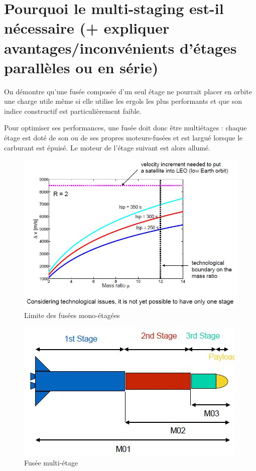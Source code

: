 \documentclass{report}
\begin{document}
\section{Pourquoi le multi-staging est-il nécessaire (+ expliquer avantages/inconvénients d'étages parallèles ou en série)}

On démontre qu'une fusée composée d'un seul étage ne pourrait placer en orbite une charge utile même si elle utilise les ergols les plus performants et que son indice constructif est particulièrement faible.

Pour optimiser ses performances, une fusée doit donc être multiétages : chaque étage est doté de son ou de ses propres moteurs-fusées et est largué lorsque le carburant est épuisé. Le moteur de l'étage suivant est alors allumé.

\begin{figure}[h!]
    \centering
    \includegraphics[scale=0.6]{52.JPG}
    \caption{Limite des fusées mono-étagées}
    \label{52}
\end{figure}

\begin{figure}[h!]
    \centering
    \includegraphics[scale=0.6]{53}
    \caption{Fusée multi-étage}
    \label{53}
\end{figure}
\end{document}
